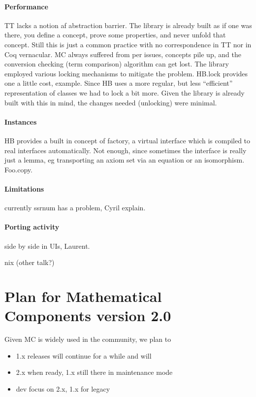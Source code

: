 \documentclass{easychair}
\begin{document}
\paragraph{Performance}

TT lacks a notion af abstraction barrier. The library is already built
as if one was there, you define a concept, prove some properties, and never
unfold that concept. Still this is just a common practice with no correspondence
in TT nor in Coq vernacular. MC always suffered from per issues, concepts pile up,
and the conversion checking (term comparison) algorithm can get lost. The
library employed various locking mechanisms to mitigate the problem. HB.lock
provides one a little cost, example.
Since HB uses a more regular, but less ``efficient'' representation of classes
we had to lock a bit more. Given the library is already built with this in mind,
the changes needed (unlocking) were minimal.

\paragraph{Instances}

HB provides a built in concept of factory, a virtual interface which is
compiled to real interfaces automatically. Not enough, since sometimes the
interface is really just a lemma, eg transporting an axiom set via an equation
or an isomorphism. Foo.copy.

\paragraph{Limitations}

currently ssrnum has a problem, Cyril explain.

\paragraph{Porting activity}

side by side in UIs, Laurent.

nix (other talk?)

\section{Plan for Mathematical Components version 2.0}

Given MC is widely used in the community, we plan to

\begin{itemize}
\item 1.x releases will continue for a while and will
\item 2.x when ready, 1.x still there in maintenance mode
\item dev focus on 2.x, 1.x for legacy
\end{itemize}

\label{sect:bib}

%
%
%


\end{document}
